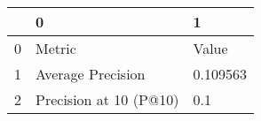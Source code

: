 \begin{tabular}{lll}
\toprule
{} &                       0 &         1 \\
\midrule
0 &                  Metric &     Value \\
1 &       Average Precision &  0.109563 \\
2 &  Precision at 10 (P@10) &       0.1 \\
\bottomrule
\end{tabular}

